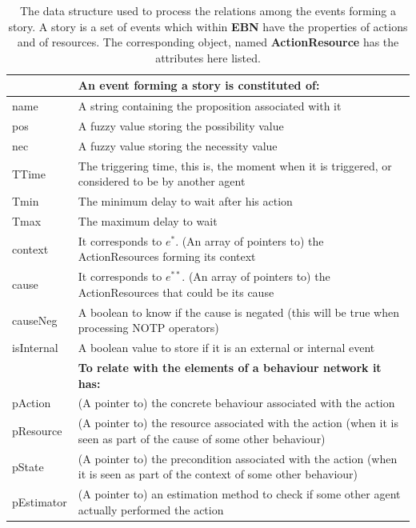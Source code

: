 \documentclass[
		twoside,openright,titlepage,numbers=noenddot,manychapters,
		headinclude,%
                footinclude=false,cleardoublepage=empty,
                BCOR=5mm,
		fontsize=11pt, %
                 enabledeprecatedfontcommands]{scrreprt}
\begin{document}
\begin{table}[]
\caption{The data structure used to process the relations among the events forming a story. A story is a set of events which within \textbf{EBN} have the properties of actions and of resources. The corresponding object, named \textbf{ActionResource} has the attributes here listed.} 


\begin{tabular*}{1.00\textwidth}{ p{}  p{} }
\\
\hline\hline

 & \textbf{An event forming a story is constituted of:} \\
 [1ex]
  \hline
name & A string containing the proposition associated with it \\
pos & A fuzzy value storing the possibility value \\
nec & A fuzzy value storing the necessity value \\
TTime & The triggering time, this is, the moment when it is triggered, or considered to be by another agent \\
Tmin & The minimum delay to wait after his action \\
Tmax & The maximum delay to wait \\
[1ex]
context & It corresponds to $e^*$. (An array of pointers to) the ActionResources forming its context \\
cause & It corresponds to $e^{**}$. (An array of pointers to) the ActionResources that could be its cause \\ 
causeNeg & A boolean to know if the cause is negated (this will be true when processing NOTP operators) \\
isInternal & A boolean value to store if it is an external or internal event \\
[1ex]
& \textbf{To relate with the elements of a behaviour network it has:} \\
[1ex] 
\hline
pAction &  (A pointer to) the concrete behaviour associated with the action \\
pResource & (A pointer to) the resource associated with the action (when it is seen as part of the cause of some other behaviour)\\
pState & (A pointer to) the precondition associated with the action (when it is seen as part of the context of some other behaviour)\\
pEstimator & (A pointer to) an estimation method to check if some other agent actually performed the action \\
[1ex]
\hline
\end{tabular*}

\label{table_story}
\end{table}
\end{document}
